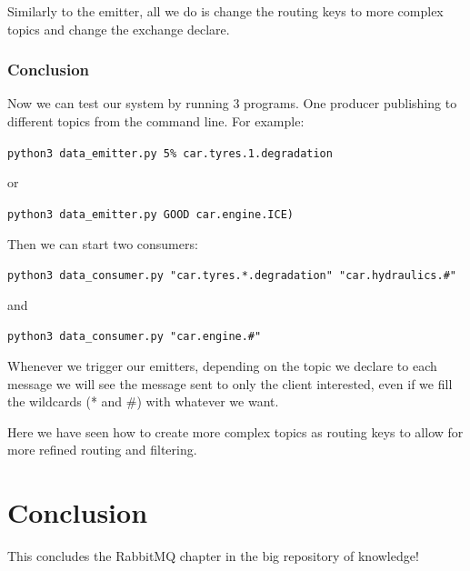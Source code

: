 \documentclass{article}
\begin{document}
Similarly to the emitter, all we do is change the routing keys to more complex topics and change the exchange declare.

\subsubsection{Conclusion}

Now we can test our system by running 3 programs. One producer publishing to different topics from the command line. For example: 

\verb|python3 data_emitter.py 5% car.tyres.1.degradation|

or 

\verb|python3 data_emitter.py GOOD car.engine.ICE)|

Then we can start two consumers:

\verb|python3 data_consumer.py "car.tyres.*.degradation" "car.hydraulics.#"|

and

\verb|python3 data_consumer.py "car.engine.#"|

Whenever we trigger our emitters, depending on the topic we declare to each message we will see the message sent to only the client interested, even if we fill the wildcards (* and \#) with whatever we want.

Here we have seen how to create more complex topics as routing keys to allow for more refined routing and filtering.

\section{Conclusion}

This concludes the RabbitMQ chapter in the big repository of knowledge!
\end{document}
